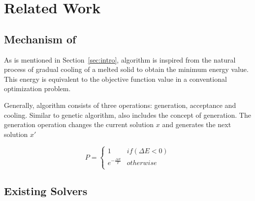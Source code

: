 \section{Related Work}
\label{sec:related}
\subsection{Mechanism of \SA}
As is mentioned in Section~\ref{sec:intro}, \SA algorithm is inspired from the natural process of gradual cooling of a melted solid to obtain the minimum energy value. This energy is equivalent to the objective function value in a conventional optimization problem.

Generally, \SA algorithm consists of three operations: generation, acceptance and cooling. Similar to genetic algorithm, \SA also includes the concept of generation. The generation operation changes the current solution $x$ and generates the next solution $x'$


\begin{equation}
\label{eq:SA_prob}
P=
\begin{cases}
1 & if(\Delta E < 0) \\
e^{-\frac{\Delta E}{T}}&otherwise \\
\end{cases}
\end{equation}
\subsection{Existing \SA Solvers}